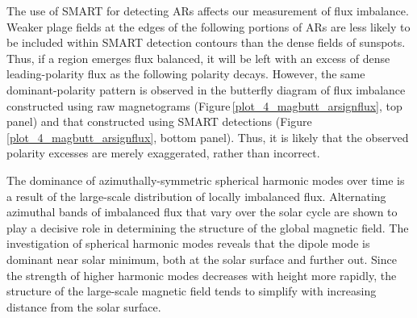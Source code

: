 \documentclass[namedreferences]{solarphysics}
\begin{document}
\begin{article}
The use of SMART for detecting ARs affects our measurement of flux imbalance. Weaker plage fields at the edges of the following portions of ARs are less likely to be included within SMART detection contours than the dense fields of sunspots. Thus, if a region emerges flux balanced, it will be left with an excess of dense leading-polarity flux as the following polarity decays. However, the same dominant-polarity pattern is observed in the butterfly diagram of flux imbalance constructed using raw magnetograms (Figure\,\ref{plot_4_magbutt_arsignflux}, top panel) and that constructed using SMART detections (Figure\,\ref{plot_4_magbutt_arsignflux}, bottom panel). Thus, it is likely that the observed polarity excesses are merely exaggerated, rather than incorrect.  


The dominance of azimuthally-symmetric spherical harmonic modes over time is a result of the large-scale distribution of locally imbalanced flux. Alternating azimuthal bands of imbalanced flux that vary over the solar cycle are shown to play a decisive role in determining the structure of the global magnetic field. The investigation of spherical harmonic modes reveals that the dipole mode is dominant near solar minimum, both at the solar surface and further out. Since the strength of higher harmonic modes decreases with height more rapidly, the structure of the large-scale magnetic field tends to simplify with increasing distance from the solar surface.


\end{article}
\end{document}

